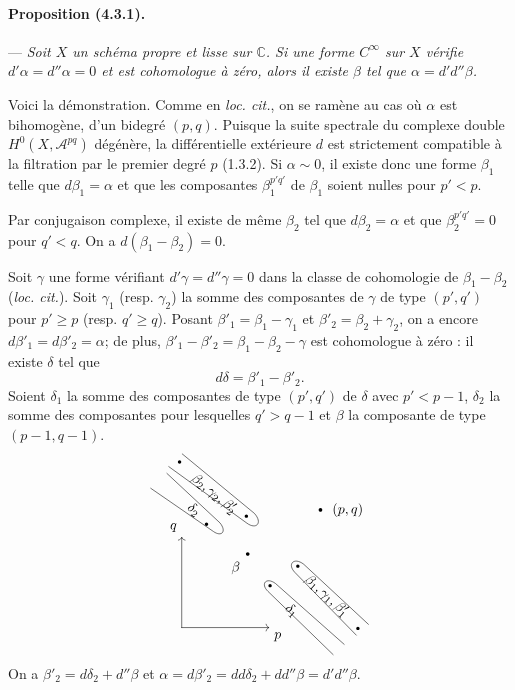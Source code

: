 \documentclass[10pt]{article}
\newcommand{\C}{\mathbb C}
\begin{document}
\paragraph{Proposition (4.3.1).} --- {\itshape Soit $X$ un schéma propre et lisse sur $\C$. Si une forme $C^\infty$ sur $X$ vérifie $d'\alpha=d''\alpha=0$ et est cohomologue à zéro, alors il existe $\beta$ tel que $\alpha=d'd''\beta$.}

Voici la démonstration. Comme en \textit{loc. cit.}, on se ramène au cas où $\alpha$ est bihomogène, d'un bidegré $(p,q)$. Puisque la suite spectrale du complexe double $H^0(X,\mathcal A^{pq})$ dégénère, la différentielle extérieure $d$ est strictement compatible à la filtration par le premier degré $p$ (1.3.2). Si $\alpha\sim0$, il existe donc une forme $\beta_1$ telle que $d\beta_1=\alpha$ et que les composantes $\beta_1^{p'q'}$ de $\beta_1$ soient nulles pour $p'<p$.

Par conjugaison complexe, il existe de même $\beta_2$ tel que $d\beta_2=\alpha$ et que $\beta_2^{p'q'}=0$ pour $q'<q$. On a $d(\beta_1-\beta_2)=0$.

Soit $\gamma$ une forme vérifiant $d'\gamma=d''\gamma=0$ dans la classe de cohomologie de $\beta_1-\beta_2$ (\textit{loc. cit.}). Soit $\gamma_1$ (resp. $\gamma_2$) la somme des composantes de $\gamma$ de type $(p',q')$ pour $p'\ge p$ (resp. $q'\ge q$). Posant $\beta'_1=\beta_1-\gamma_1$ et $\beta'_2=\beta_2+\gamma_2$, on a encore $d\beta'_1=d\beta'_2=\alpha$; de plus, $\beta'_1-\beta'_2=\beta_1-\beta_2-\gamma$ est cohomologue à zéro : il existe $\delta$ tel que
\[
d\delta=\beta'_1-\beta'_2.
\]
Soient $\delta_1$ la somme des composantes de type $(p',q')$ de $\delta$ avec $p'<p-1$, $\delta_2$ la somme des composantes pour lesquelles $q'>q-1$ et $\beta$ la composante de type $(p-1,q-1)$.
\[
\begin{tikzpicture}[x=.68cm,y=.68cm,baseline=(current bounding box.center),line cap=round,line join=round]
\draw[->] (0,0)--(3.25,0) node[below right] {$p$};
\draw[->] (0,0)--(0,3.35) node[above left] {$q$};
\fill (2.45,2.72) circle (1.3pt) node[below left=2pt] {$\beta$};
\fill (5.15,4.35) circle (1.3pt) node[right=5pt] {$(p,q)$};
\draw (-1.15,5.15)--(1.18,3.55)
  .. controls (1.48,3.34) and (1.68,3.55) .. (1.42,3.87)--(-.55,5.70);
\fill (.92,3.82) circle (1.2pt);
\node[rotate=-39] at (.45,4.35) {$\delta_2$};
\draw (-.48,5.95)--(2.42,3.86)
  .. controls (2.76,3.61) and (3.02,3.86) .. (2.70,4.22)--(.02,6.42);
\fill (-.08,6.12) circle (1.2pt);
\fill (2.40,4.12) circle (1.2pt);
\node[rotate=-39] at (1.20,4.94) {$\beta_2,\gamma_2,\beta'_2$};
\draw (5.62,-1.00)--(3.20,1.34)
  .. controls (2.91,1.62) and (3.14,1.88) .. (3.48,1.63)--(6.03,-.62);
\fill (3.28,1.55) circle (1.2pt);
\node[rotate=-43] at (4.08,.62) {$\delta_1$};
\draw (6.48,-.28)--(4.20,2.04)
  .. controls (3.90,2.35) and (4.17,2.62) .. (4.53,2.34)--(6.93,.12);
\fill (4.31,2.27) circle (1.2pt);
\fill (6.54,-.03) circle (1.2pt);
\node[rotate=-42] at (5.38,1.17) {$\beta_1,\gamma_1,\beta'_1$};
\end{tikzpicture}
\]
On a $\beta'_2=d\delta_2+d''\beta$ et $\alpha=d\beta'_2=dd\delta_2+dd''\beta=d'd''\beta$.
\end{document}
